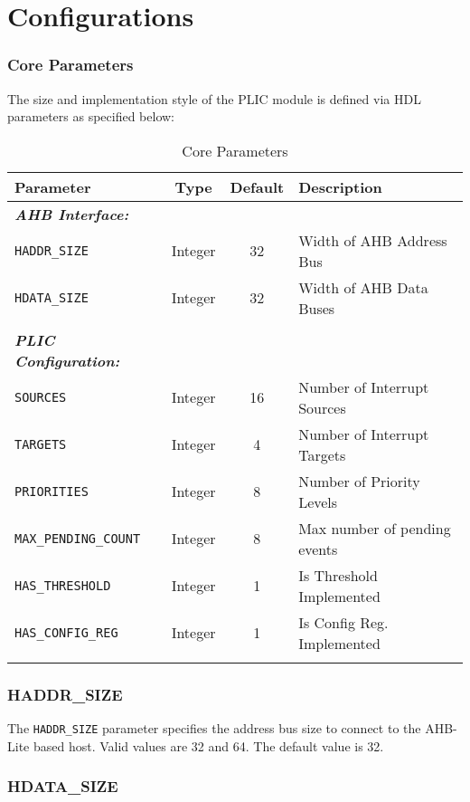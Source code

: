 \chapter{Configurations}

\subsection{Core Parameters}

The size and implementation style of the PLIC module is defined via HDL
parameters as specified below:

\begin{longtable}[c]{@{\extracolsep{\fill}}lccl@{}}	
	\toprule 
	\textbf{Parameter}           & \textbf{Type} & \textbf{Default} & \textbf{Description}\\
	\midrule
	\endhead
	\emph{\textbf{AHB Interface:}}\\
	\texttt{HADDR\_SIZE}         & Integer & 32 & Width of AHB Address Bus\\
	\texttt{HDATA\_SIZE}         & Integer & 32 & Width of AHB Data Buses\\
	\\
	\emph{\textbf{PLIC Configuration:}}\\
	\texttt{SOURCES}             & Integer & 16 & Number of Interrupt Sources\\
	\texttt{TARGETS}             & Integer & 4 & Number of Interrupt Targets\\
	\texttt{PRIORITIES}          & Integer & 8 & Number of Priority Levels\\
	\texttt{MAX\_PENDING\_COUNT} & Integer & 8 & Max number of pending events\\
	\texttt{HAS\_THRESHOLD}      & Integer & 1 & Is Threshold Implemented\\
	\texttt{HAS\_CONFIG\_REG}    & Integer & 1 & Is Config Reg. Implemented\\
	\bottomrule 	
	\caption{Core Parameters}
	\label{tab:CoreParams}
\end{longtable}

\subsection{HADDR\_SIZE}

The \texttt{HADDR\_SIZE} parameter specifies the address bus size to
connect to the AHB-Lite based host. Valid values are 32 and 64. The
default value is 32.

\subsection{HDATA\_SIZE}

